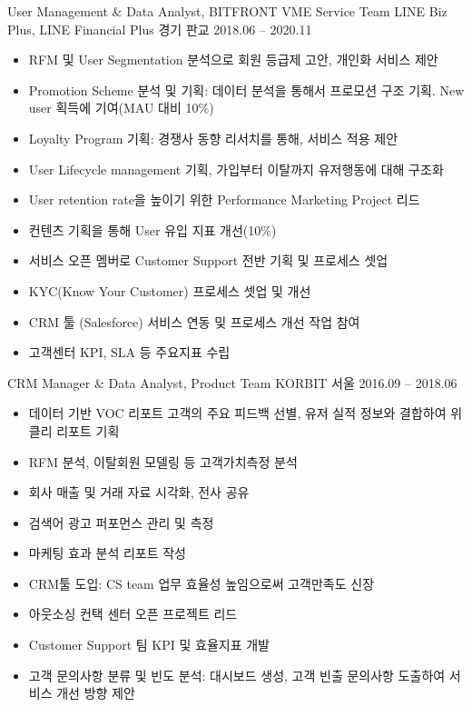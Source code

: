 \documentclass[11pt, a4paper]{awesome-cv}
\begin{document}
\begin{cventries}
  \cventry
    {User Management \& Data Analyst, BITFRONT VME Service Team}
    {LINE Biz Plus, LINE Financial Plus}
    {경기 판교}
    {2018.06 -- 2020.11}
    {
      \begin{itemize}
        \item RFM 및 User Segmentation 분석으로 회원 등급제 고안, 개인화 서비스 제안
        \item Promotion Scheme 분석 및 기획: 데이터 분석을 통해서 프로모션 구조 기획. New user 획득에 기여(MAU 대비 10\%)
        \item Loyalty Program 기획: 경쟁사 동향 리서치를 통해, 서비스 적용 제안
        \item User Lifecycle management 기획, 가입부터 이탈까지 유저행동에 대해 구조화
        \item User retention rate을 높이기 위한 Performance Marketing Project 리드
        \item 컨텐츠 기획을 통해 User 유입 지표 개선(10\%)
        \item 서비스 오픈 멤버로 Customer Support 전반 기획 및 프로세스 셋업
        \item KYC(Know Your Customer) 프로세스 셋업 및 개선
        \item CRM 툴 (Salesforce) 서비스 연동 및 프로세스 개선 작업 참여
        \item 고객센터 KPI, SLA 등 주요지표 수립
      \end{itemize}
    }

  \cventry
    {CRM Manager \& Data Analyst, Product Team}
    {KORBIT}
    {서울}
    {2016.09 -- 2018.06}
    {
      \begin{itemize}
        \item 데이터 기반 VOC 리포트 고객의 주요 피드백 선별, 유저 실적 정보와 결합하여 위클리 리포트 기획
        \item RFM 분석, 이탈회원 모델링 등 고객가치측정 분석
        \item 회사 매출 및 거래 자료 시각화, 전사 공유
        \item 검색어 광고 퍼포먼스 관리 및 측정
        \item 마케팅 효과 분석 리포트 작성
        \item CRM툴 도입: CS team 업무 효율성 높임으로써 고객만족도 신장
        \item 아웃소싱 컨택 센터 오픈 프로젝트 리드
        \item Customer Support 팀 KPI 및 효율지표 개발
        \item 고객 문의사항 분류 및 빈도 분석: 대시보드 생성, 고객 빈출 문의사항 도출하여 서비스 개선 방향 제안
      \end{itemize}
    }


\end{cventries}
\end{document}
